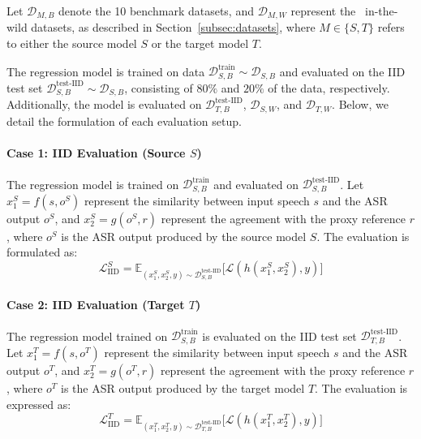 Let $\mathcal{D}_{M,B}$ denote the 10 benchmark datasets, and $\mathcal{D}_{M, W}$ represent the {\nwilds}~in-the-wild datasets, as described in Section~\ref{subsec:datasets}, where $M \in \{S, T\}$ refers to either the source model $S$ or the target model $T$. 

The regression model is trained on data $\mathcal{D}_{S,B}^{\text{train}} \sim \mathcal{D}_{S,B}$ and evaluated on the IID test set $\mathcal{D}_{S,B}^{\text{test-IID}} \sim \mathcal{D}_{S,B}$, consisting of $80\%$ and $20\%$ of the data, respectively. Additionally, the model is evaluated on $\mathcal{D}_{T,B}^{\text{test-IID}}$, $\mathcal{D}_{S, W}$, and $\mathcal{D}_{T, W}$. Below, we detail the formulation of each evaluation setup.

\paragraph{Case 1: IID Evaluation (Source \(S\))}\label{para:case_1_data_iid_eval}
The regression model is trained on $\mathcal{D}_{S,B}^{\text{train}}$ and evaluated on $\mathcal{D}_{S,B}^{\text{test-IID}}$. Let \(x_1^S = f(s, o^S)\) represent the similarity between input speech \(s\) and the ASR output \(o^S\), and \(x_2^S = g(o^S, r)\) represent the agreement with the proxy reference \(r\), where \(o^S\) is the ASR output produced by the source model \(S\). The evaluation is formulated as:
\begin{equation}
\mathcal{L}_{\text{IID}}^S = \mathbb{E}_{(x_1^S, x_2^S, y) \sim \mathcal{D}_{S,B}^{\text{test-IID}}} \big[\mathcal{L}(h(x_1^S, x_2^S), y)\big]
\end{equation}
 
\paragraph{Case 2: IID Evaluation (Target \(T\))}\label{para:case_2_data_iid_eval}
The regression model trained on $\mathcal{D}_{S,B}^{\text{train}}$ is evaluated on the IID test set $\mathcal{D}_{T,B}^{\text{test-IID}}$. Let \(x_1^T = f(s, o^T)\) represent the similarity between input speech \(s\) and the ASR output \(o^T\), and \(x_2^T = g(o^T, r)\) represent the agreement with the proxy reference \(r\), where \(o^T\) is the ASR output produced by the target model \(T\). The evaluation is expressed as:
\begin{equation}
\mathcal{L}_{\text{IID}}^T = \mathbb{E}_{(x_1^T, x_2^T, y) \sim \mathcal{D}_{T,B}^{\text{test-IID}}} \big[\mathcal{L}(h(x_1^T, x_2^T), y)\big]
\end{equation}

